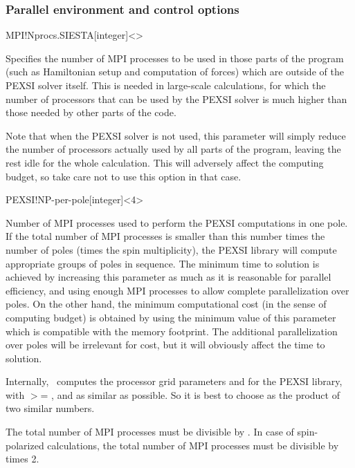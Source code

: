 \subsubsection{Parallel environment and control options}

\begin{fdfentry}{MPI!Nprocs.SIESTA}[integer]<>

  Specifies the number of MPI processes to be used in those parts of
  the program (such as Hamiltonian setup and computation of forces)
  which are outside of the PEXSI solver itself. This is needed in
  large-scale calculations, for which the number of processors that
  can be used by the PEXSI solver is much higher than those needed by
  other parts of the code.
  
  Note that when the PEXSI solver is not used, this parameter will
  simply reduce the number of processors actually used by all parts of
  the program, leaving the rest idle for the whole calculation. This
  will adversely affect the computing budget, so take care not to use
  this option in that case.
  
\end{fdfentry}

\begin{fdfentry}{PEXSI!NP-per-pole}[integer]<4>

  Number of MPI processes used to perform the PEXSI computations in
  one pole. If the total number of MPI processes is smaller than this
  number times the number of poles (times the spin multiplicity), the
  PEXSI library will compute appropriate groups of poles in
  sequence. The minimum time to solution is achieved by increasing
  this parameter as much as it is reasonable for parallel efficiency,
  and using enough MPI processes to allow complete parallelization
  over poles. On the other hand, the minimum computational cost (in
  the sense of computing budget) is obtained by using the minimum
  value of this parameter which is compatible with the memory
  footprint. The additional parallelization over poles will be
  irrelevant for cost, but it will obviously affect the time to
  solution.

  Internally, \siesta\ computes the processor grid parameters
   and  for the PEXSI library, with
   $>$= , and as similar as possible. So it
  is best to choose  as the product of two
  similar numbers.
  
  \note The total number of MPI processes must be divisible by
  . In case of spin-polarized calculations, the
  total number of MPI processes must be divisible by
   times 2.

\end{fdfentry}

